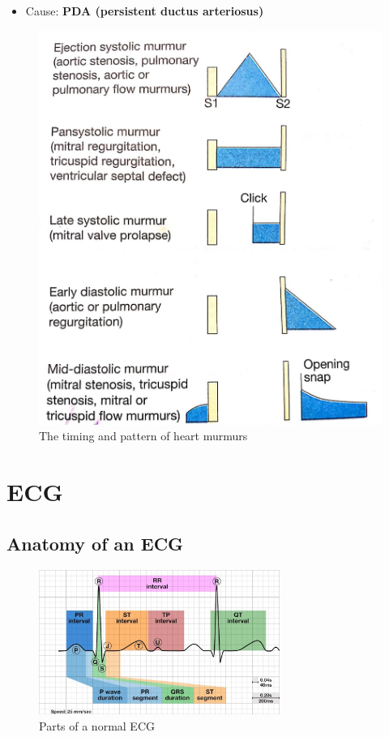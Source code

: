 \documentclass[
  12pt,
]{memoir}
\providecommand{\tightlist}{%
  \setlength{\itemsep}{0pt}\setlength{\parskip}{0pt}}
\begin{document}
\begin{itemize}
\tightlist
\item
  Cause: \textbf{PDA (persistent ductus arteriosus)}
\end{itemize}

\begin{figure}[t!]
    \centering
    \includegraphics[width=.7\textwidth]{../assets/med/murmur.jpg}
    \vspace{7mm}
    \caption{The timing and pattern of heart murmurs}
    \label{fig:murmur}
\end{figure}

\pagebreak

\hypertarget{ecg-1}{%
\section{ECG}\label{ecg-1}}

\label{sec:ecg}

\hypertarget{anatomy-of-an-ecg}{%
\subsection{Anatomy of an ECG}\label{anatomy-of-an-ecg}}

\begin{figure}[h!]
    \centering
    \includegraphics[width=0.7\textwidth]{../assets/med/ecg-anatomy.jpg}
    \caption{Parts of a normal ECG}
\end{figure}
\end{document}
